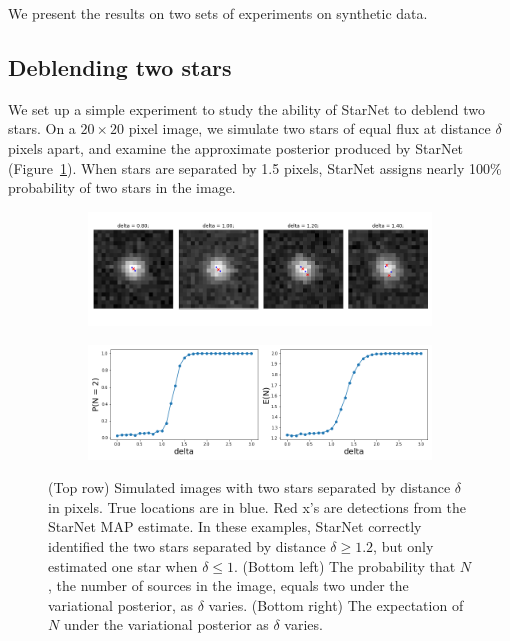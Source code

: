 
We present the results on two sets of experiments on synthetic data.

\subsection{Deblending two stars}

We set up a simple experiment to study the
ability of StarNet to deblend two stars.
On a $20\times20$ pixel image,
we simulate two stars of equal flux at distance $\delta$ pixels apart, and
examine the approximate posterior produced by StarNet (Figure~\ref{fig:deblending_fig}).
When stars are separated by 1.5 pixels, StarNet assigns nearly 100\% probability
of two stars in the image.

\begin{figure}[tb]
    \centering
    \begin{subfigure}{0.8\textwidth}
        \includegraphics[width=\textwidth]{figures/deblending/example_deblending.png}
    \end{subfigure}
    \begin{subfigure}{0.8\textwidth}
        \includegraphics[width=\textwidth]{figures/deblending/summary_statistics.png}
    \end{subfigure}
    \caption{(Top row) Simulated images with two stars separated by distance $\delta$ in pixels.
    True locations are in blue. Red x's are detections from the StarNet MAP estimate.
    In these examples, StarNet correctly identified the two stars separated by distance $\delta \geq 1.2$,
    but only estimated one star when $\delta \leq 1$.
    (Bottom left) The probability that $N$, the number of sources in the image, equals two
    under the variational posterior, as $\delta$ varies.
    (Bottom right) The expectation of $N$ under the variational posterior as $\delta$ varies. }
    \label{fig:deblending_fig}
\end{figure}

